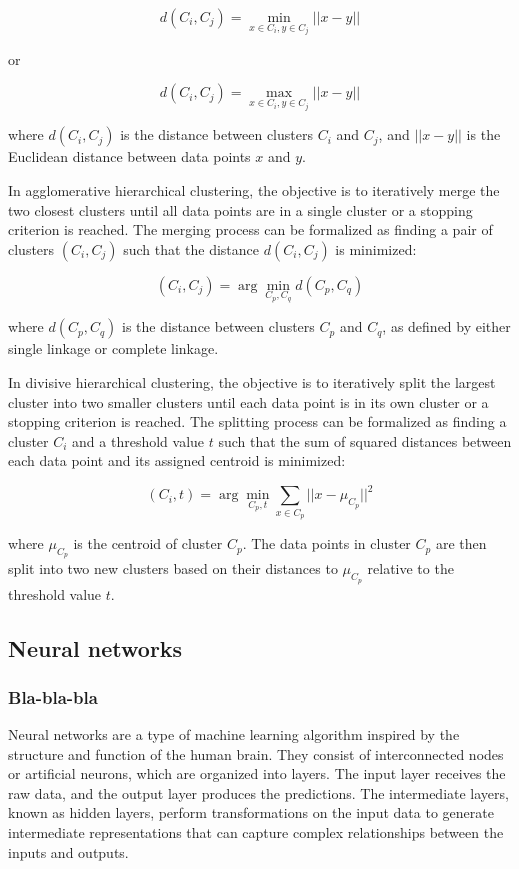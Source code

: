 \documentclass[12pt, a4paper, oneside]{article}
\begin{document}
$$ d(C_i, C_j) = \min_{x \in C_i, y \in C_j} ||x - y|| $$

or

$$ d(C_i, C_j) = \max_{x \in C_i, y \in C_j} ||x - y|| $$

where $d(C_i, C_j)$ is the distance between clusters $C_i$ and $C_j$, and $||x - y||$ is the Euclidean distance between data points $x$ and $y$.

In agglomerative hierarchical clustering, the objective is to iteratively merge the two closest clusters until all data points are in a single cluster or a stopping criterion is reached. The merging process can be formalized as finding a pair of clusters $(C_i, C_j)$ such that the distance $d(C_i, C_j)$ is minimized:

$$ (C_i, C_j) = \arg \min_{C_p, C_q} d(C_p, C_q) $$

where $d(C_p, C_q)$ is the distance between clusters $C_p$ and $C_q$, as defined by either single linkage or complete linkage.

In divisive hierarchical clustering, the objective is to iteratively split the largest cluster into two smaller clusters until each data point is in its own cluster or a stopping criterion is reached. The splitting process can be formalized as finding a cluster $C_i$ and a threshold value $t$ such that the sum of squared distances between each data point and its assigned centroid is minimized:

$$ (C_i, t) = \arg \min_{C_p, t} \sum_{x \in C_p} ||x - \mu_{C_p}||^2 $$

where $\mu_{C_p}$ is the centroid of cluster $C_p$. The data points in cluster $C_p$ are then split into two new clusters based on their distances to $\mu_{C_p}$ relative to the threshold value $t$.
\subsection{ Neural networks  }
\subsubsection{Bla-bla-bla } 
Neural networks are a type of machine learning algorithm inspired by the structure and function of the human brain. They consist of interconnected nodes or artificial neurons, which are organized into layers. The input layer receives the raw data, and the output layer produces the predictions. The intermediate layers, known as hidden layers, perform transformations on the input data to generate intermediate representations that can capture complex relationships between the inputs and outputs.
\end{document}
